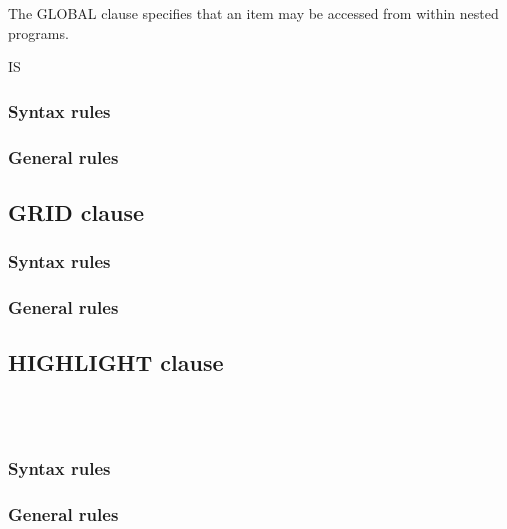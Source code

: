 The GLOBAL clause specifies that an item may be accessed from within nested programs.

\begin{syntax}
  IS 
\end{syntax}

\subsubsection{Syntax rules}

\subsubsection{General rules}

\subsection{GRID clause}

\begin{syntax}[\miscextcolour]
\end{syntax}

\subsubsection{Syntax rules}

\subsubsection{General rules}

\subsection{HIGHLIGHT clause}

\begin{syntax}
  \begin{1=}
     \\
     \\
  \end{1=}
\end{syntax}

\subsubsection{Syntax rules}

\subsubsection{General rules}

